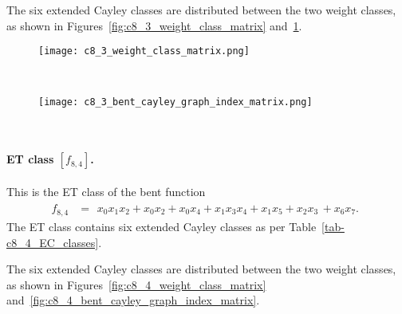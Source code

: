 The six extended Cayley classes are distributed between the two weight classes,
as shown in Figures~\ref{fig:c8_3_weight_class_matrix} and~\ref{fig:c8_3_bent_cayley_graph_index_matrix}.

\begin{figure}[!bhpt] %
\centering
\begin{minipage}{.48\textwidth}
  \centering
  \texttt{[image: c8\_3\_weight\_class\_matrix.png]}
  \label{fig:c8_3_weight_class_matrix}
\end{minipage}%
~~~~
\begin{minipage}{.48\textwidth}
  \centering
  \texttt{[image: c8\_3\_bent\_cayley\_graph\_index\_matrix.png]}
  \label{fig:c8_3_bent_cayley_graph_index_matrix}
\end{minipage}
\end{figure}
~
\newpage
%
\paragraph*{ET class $[f_{8,4}]$.}
This is the ET class of the bent function
\small{}
\begin{align*}
f_{ 8 , 4 } &=
\begin{array}{l}
x_{0} x_{1} x_{2} + x_{0} x_{2} + x_{0} x_{4} + x_{1} x_{3} x_{4} + x_{1} x_{5} + x_{2} x_{3}\, +
x_{6} x_{7}.
\end{array}
\end{align*}
\normalsize{}
The ET class contains six extended Cayley classes as per Table~\ref{tab-c8_4_EC_classes}.

The six extended Cayley classes are distributed between the two weight classes,
as shown in Figures~\ref{fig:c8_4_weight_class_matrix} and~\ref{fig:c8_4_bent_cayley_graph_index_matrix}.

